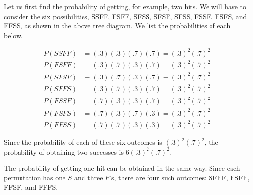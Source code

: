 \begin{solution}
\begin{figure}[ht!]
    \end{figure}

    Let us first find the probability of getting, for example, two hits. We will have to consider the six possibilities, SSFF, FSFF, SFSS, SFSF, SFSS, FSSF, FSFS, and FFSS, as shown in the above tree diagram. We list the probabilities of each below.

    \begin{align*}
        P(SSFF) & = (.3)(.3)(.7)(.7) = (.3)^2(.7)^2 \\
        P(FSFF) & = (.3)(.7)(.3)(.7) = (.3)^2(.7)^2 \\
        P(SFSF) & = (.3)(.7)(.3)(.7) = (.3)^2(.7)^2 \\
        P(SFFS) & = (.3)(.7)(.3)(.7) = (.3)^2(.7)^2 \\
        P(FSSF) & = (.7)(.3)(.3)(.7) = (.3)^2(.7)^2 \\
        P(FSFS) & = (.7)(.3)(.7)(.3) = (.3)^2(.7)^2 \\
        P(FFSS) & = (.7)(.7)(.3)(.3) = (.3)^2(.7)^2
    \end{align*}

    Since the probability of each of these six outcomes is \((.3)^2(.7)^2\), the probability of obtaining two successes is \(6(.3)^2(.7)^2\).

    The probability of getting one hit can be obtained in the same way. Since each permutation has one \(S\) and three \(F\)'s, there are four such outcomes: SFFF, FSFF, FFSF, and FFFS.


\end{solution}
